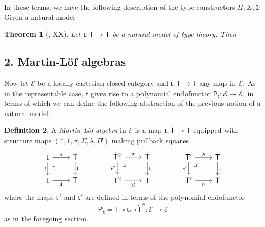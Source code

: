 \documentclass[12pt]{article}
\newcommand{\EE}{\ensuremath{\mathcal{E}}}
\newcommand{\alg}[1]{\ensuremath{\mathsf{#1}}}
\renewcommand{\to}{\ensuremath{\rightarrow}}
\newcommand{\too}{\ensuremath{\longrightarrow}}
\renewcommand{\t}{\ensuremath{\mathsf{t}}}
\newcommand{\tT}{\ensuremath{{\t}:\TT\to\T}}
\newcommand{\T}{\ensuremath{\mathsf{T}}}
\newcommand{\TT}{\ensuremath{\dot{\mathsf{T}}}}
\newcommand{\pbcorner}{\arrow[dr,phantom,"\lrcorner" very near start, shift right=.5ex]} %
\newtheorem{theorem}{Theorem}
\theoremstyle{remark}
\theoremstyle{definition}
\newtheorem{definition}[theorem]{Definition}
\begin{document}
\medskip

In these terms, we have the following description of the type-constructors $\Pi, \Sigma, \mathsf{1}$:
Given a natural model 
\begin{theorem}[\cite{A:NM}, XX]
Let $\tT$ be a natural model of type theory.  Then 
\end{theorem}

\subsection*{2. Martin-L\"of algebras}\label{sec:MLalgebras}

Now let $\EE$ be a locally cartesian closed category and $\tT$ any map in~$\EE$. As in the representable case, $\t$ gives rise to a polynomial endofunctor $\alg{P}_\t : \EE\to\EE$, in terms of which we can define the following abstraction of the previous notion of a  natural model.

\begin{definition}\label{def:MLalg}
A \emph{Martin-L\"of algebra} in $\EE$ is a map $\tT$ equipped with structure maps $(*, 1, \sigma, \Sigma, \lambda, \Pi)$ making pullback squares 
\begin{equation}\label{diag:MLalg}
\begin{tikzcd}
	1 \ar[r,"*"] \ar[d,swap,"!"] \pbcorner &  \TT \ar[d, "\t"]\\  
	1 \ar[r, swap,"\mathsf{1}"] & \T
 \end{tikzcd}\qquad \qquad 
 \begin{tikzcd}
	\TT^2  \ar[r,"\sigma"] \ar[d,swap,"\t^2"] \pbcorner &  \TT \ar[d, "\t"]\\  
	\T^2 \ar[r,swap, "\Sigma"] & \T
	 \end{tikzcd} \qquad \qquad 
	 \begin{tikzcd}
	\TT'  \ar[r,"\lambda"] \ar[d,swap,"\t' "] \pbcorner &  \TT \ar[d, "\t"]\\  
	\T' \ar[r,swap, "\Pi"] & \T
 \end{tikzcd} 
 \end{equation}
 where the maps $\t^2$ and $\t'$ are defined in terms of the polynomial endofunctor $$\alg{P}_\t = \T_! \circ \t_* \circ \TT^* : \EE\too\EE$$ as in the foregoing section.
\end{definition}




\end{document}
